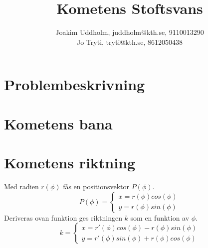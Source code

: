 \documentclass[11pt,twoside]{article}
\title{Kometens Stoftsvans}
\author{Joakim Uddholm, juddholm@kth.se, 9110013290 \\
		Jo Tryti, tryti@kth.se, 8612050438}
\date{}
\begin{document}
\maketitle

\section{Problembeskrivning}


\section{Kometens bana}

\section{Kometens riktning}	
Med radien $r(\phi)$ fås en positionsvektor $P(\phi)$.
\begin{equation}
	P(\phi) = \begin{cases}
	x = r(\phi) cos(\phi) \\
	y = r(\phi) sin(\phi)
	\end{cases}
\end{equation}
Deriveras ovan funktion ges riktningen $k$ som en funktion av $\phi$. 
\begin{equation}
	k = \begin{cases}
	x = r'(\phi) cos(\phi) - r(\phi) sin(\phi) \\
	y = r'(\phi) sin(\phi) + r(\phi) cos(\phi)
	\end{cases}
\end{equation}
\end{document}
